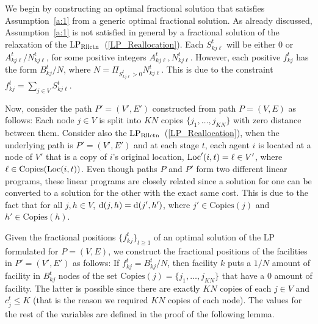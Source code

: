 We begin by constructing an optimal fractional solution that satisfies Assumption~\ref{a:1} from a generic optimal fractional solution. As already discussed, Assumption~\ref{a:1} is 
not satisfied in general by a fractional solution of the relaxation of the $\mathrm{LP_{\mathrm{Rllctn}}}$~(\ref{LP_Reallocation}).
Each $S_{k j \ell}^t$ will be either $0$ or $A_{k j \ell}^t/N_{k j \ell}^t$, for  
some positive integers $A_{k j \ell}^t, N_{k j \ell}^t$. However, each positive $f_{kj}^t$ 
has the form $B_{k j}^t/N$,  where $N = \Pi_{S_{kj\ell}^t > 0} N_{k j \ell}^t$. 
This is due to the constraint $f_{k j}^t = \sum_{j \in V}S_{k j \ell}^t$.

Now, consider the path $P' = (V',E')$ constructed from
path $P= (V,E)$ as follows: Each node $j \in V$
is split into $K N$ copies $\{j_1,\ldots, j_{KN}\}$ with zero distance 
between them. Consider also the $\mathrm{LP_{\mathrm{Rllctn}}}$~(\ref{LP_Reallocation}), when the underlying path is $P' = 
(V',E')$ and at each stage $t$, each agent $i$ is located
at a node of $V'$ that is a copy of $i$'s original location, $\mathrm{Loc}'(i,t) = \ell 
\in V'$, where $\ell \in \text{Copies}( \mathrm{Loc}(i,t))$.
Even though paths $P$ and $P'$ form two different linear programs, these linear programs  are closely related since a solution 
for one can be converted to a solution for the other with the exact same 
cost. This is due to the fact that
for all $j,h \in V$, $\mathrm{d}(j,h) = \mathrm{d}(j',h')$, where $j'\in \text{Copies}(j)$ and $h'\in 
\text{Copies}(h)$. 




Given the fractional positions $\{f_{k j}^t\}_{t \geq 1}$ of an optimal solution of 
the LP formulated for $P=(V,E)$, we construct the fractional positions
of the facilities in $P' = (V',E')$ as follows: 
If $f_{k j}^t = B_{k j}^t / N$, then 
facility $k$ puts a $1/N$ amount of facility in $B_{k j}^t$ nodes of the set 
$\text{Copies}(j)=\{j_1,\ldots, j_{K N}\}$
that have a $0$ amount of facility. The latter is possible since there are exactly 
$K N$ copies of each $j \in V$ and $c_j^t \leq K$ (that is the reason we 
required $KN$ copies of each node). The values for the rest of the variables are 
defined in the proof of the following lemma.

